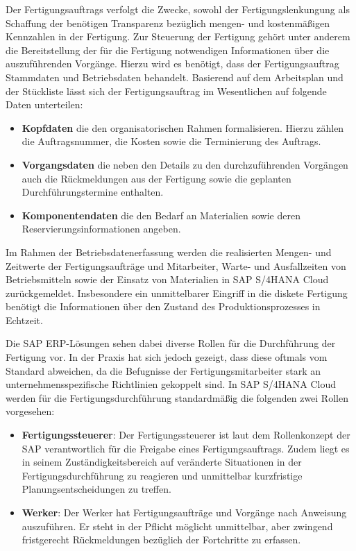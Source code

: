 Der Fertigungsauftrags verfolgt die Zwecke, sowohl der Fertigungslenkungung als Schaffung der benötigen Transparenz bezüglich mengen- und kostenmäßigen Kennzahlen in der Fertigung. Zur Steuerung der Fertigung gehört unter anderem die Bereitstellung der für die Fertigung notwendigen Informationen über die auszuführenden Vorgänge. Hierzu wird es benötigt, dass der Fertigungsauftrag Stammdaten und Betriebsdaten behandelt. Basierend auf dem Arbeitsplan und der Stückliste lässt sich der Fertigungsauftrag im Wesentlichen auf folgende Daten unterteilen:

\begin{itemize}
    \item \textbf{Kopfdaten} die den organisatorischen Rahmen formalisieren. Hierzu zählen die Auftragsnummer, die Kosten sowie die Terminierung des Auftrags.
    \item \textbf{Vorgangsdaten} die neben den Details zu den durchzuführenden Vorgängen auch die Rückmeldungen aus der Fertigung sowie die geplanten Durchführungstermine enthalten.
    \item \textbf{Komponentendaten} die den Bedarf an Materialien sowie deren Reservierungsinformationen angeben.
\end{itemize}

Im Rahmen der Betriebsdatenerfassung werden die realisierten Mengen- und Zeitwerte der Fertigungsaufträge und Mitarbeiter, Warte- und Ausfallzeiten von Betriebsmitteln sowie der Einsatz von Materialien in SAP S/4HANA Cloud zurückgemeldet. Insbesondere ein unmittelbarer Eingriff in die diskete Fertigung benötigt die Informationen über den Zustand des Produktionsprozesses in Echtzeit. 

Die SAP \ac{ERP}-Lösungen sehen dabei diverse Rollen für die Durchführung der Fertigung vor. In der Praxis hat sich jedoch gezeigt, dass diese oftmals vom Standard abweichen, da die Befugnisse der Fertigungsmitarbeiter stark an unternehmensspezifische Richtlinien gekoppelt sind.
\cite{Frick.2008}
In SAP S/4HANA Cloud werden für die Fertigungsdurchführung standardmäßig die folgenden zwei Rollen vorgesehen:
\begin{itemize}
    \item \textbf{Fertigungssteuerer}: Der Fertigungssteuerer ist laut dem Rollenkonzept der SAP verantwortlich für die Freigabe eines Fertigungsauftrags. Zudem liegt es in seinem Zuständigkeitsbereich auf veränderte Situationen in der Fertigungsdurchführung zu reagieren und unmittelbar kurzfristige Planungsentscheidungen zu treffen.
    \item \textbf{Werker}: Der Werker hat Fertigungsaufträge und Vorgänge nach Anweisung auszuführen. Er steht in der Pflicht möglicht unmittelbar, aber zwingend fristgerecht Rückmeldungen bezüglich der Fortchritte zu erfassen.
\end{itemize}

